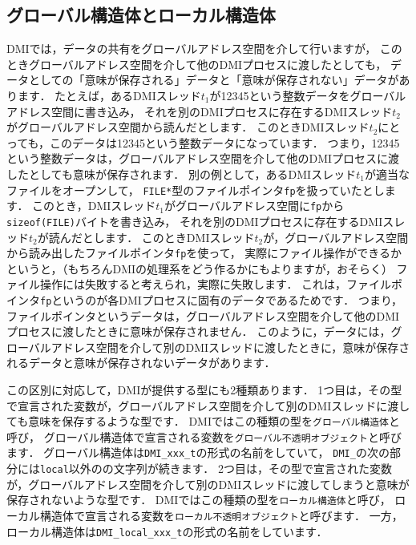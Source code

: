 \documentclass[report,12pt]{jsbook}
\begin{document}
\subsection{グローバル構造体とローカル構造体}

DMIでは，データの共有をグローバルアドレス空間を介して行いますが，
このときグローバルアドレス空間を介して他のDMIプロセスに渡したとしても，
データとしての「意味が保存される」データと「意味が保存されない」データがあります．
たとえば，あるDMIスレッド$t_1$が12345という整数データをグローバルアドレス空間に書き込み，
それを別のDMIプロセスに存在するDMIスレッド$t_2$がグローバルアドレス空間から読んだとします．
このときDMIスレッド$t_2$にとっても，このデータは12345という整数データになっています．
つまり，12345という整数データは，グローバルアドレス空間を介して他のDMIプロセスに渡したとしても意味が保存されます．
別の例として，あるDMIスレッド$t_1$が適当なファイルをオープンして，
\texttt{FILE*}型のファイルポインタ\texttt{fp}を扱っていたとします．
このとき，DMIスレッド$t_1$がグローバルアドレス空間に\texttt{fp}から\texttt{sizeof(FILE)}バイトを書き込み，
それを別のDMIプロセスに存在するDMIスレッド$t_2$が読んだとします．
このときDMIスレッド$t_2$が，グローバルアドレス空間から読み出したファイルポインタ\texttt{fp}を使って，
実際にファイル操作ができるかというと，（もちろんDMIの処理系をどう作るかにもよりますが，おそらく）
ファイル操作には失敗すると考えられ，実際に失敗します．
これは，ファイルポインタ\texttt{fp}というのが各DMIプロセスに固有のデータであるためです．
つまり，ファイルポインタというデータは，グローバルアドレス空間を介して他のDMIプロセスに渡したときに意味が保存されません．
このように，データには，グローバルアドレス空間を介して別のDMIスレッドに渡したときに，意味が保存されるデータと意味が保存されないデータがあります．

この区別に対応して，DMIが提供する型にも2種類あります．
1つ目は，その型で宣言された変数が，グローバルアドレス空間を介して別のDMIスレッドに渡しても意味を保存するような型です．
DMIではこの種類の型を\texttt{グローバル構造体}と呼び，
グローバル構造体で宣言される変数を\texttt{グローバル不透明オブジェクト}と呼びます．
グローバル構造体は\texttt{DMI\_xxx\_t}の形式の名前をしていて，
\texttt{DMI\_}の次の部分には\texttt{local}以外のの文字列が続きます．
2つ目は，その型で宣言された変数が，グローバルアドレス空間を介して別のDMIスレッドに渡してしまうと意味が保存されないような型です．
DMIではこの種類の型を\texttt{ローカル構造体}と呼び，
ローカル構造体で宣言される変数を\texttt{ローカル不透明オブジェクト}と呼びます．
一方，ローカル構造体は\texttt{DMI\_local\_xxx\_t}の形式の名前をしています．
\end{document}
